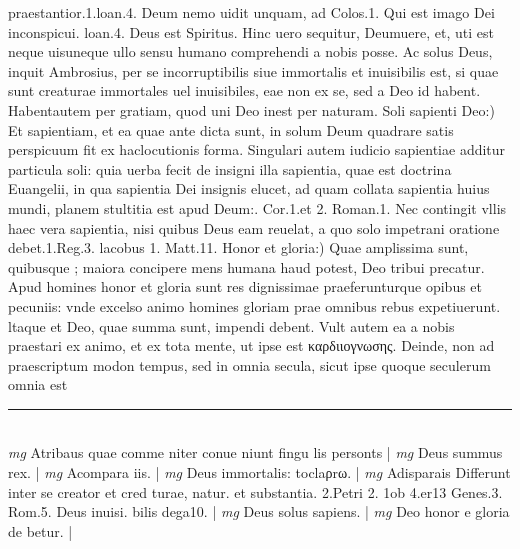 \documentclass{article}
\begin{document}
\begin{pages}
praestantior.1.loan.4. Deum nemo uidit unquam, ad Colos.1. Qui est imago Dei inconspicui. loan.4. Deus est Spiritus. Hinc uero sequitur, Deumuere, et, uti est neque  uisuneque  ullo sensu humano comprehendi a nobis posse. Ac solus Deus, inquit Ambrosius, per se incorruptibilis siue immortalis et inuisibilis est, si quae sunt creaturae immortales uel inuisibiles, eae non ex se, sed a Deo id habent. Habentautem per gratiam, quod uni Deo inest per naturam.  \pend\pstart Soli sapienti Deo:) Et sapientiam, et ea quae ante dicta sunt, in solum Deum quadrare satis perspicuum fit ex haclocutionis forma. Singulari autem iudicio sapientiae additur particula soli: quia uerba fecit de insigni illa sapientia, quae est doctrina Euangelii, in qua sapientia Dei insignis elucet, ad quam collata sapientia huius mundi, planem stultitia est apud Deum:. Cor.1.et 2. Roman.1. Nec contingit vllis haec vera sapientia, nisi quibus  Deus eam reuelat, a quo solo impetrani oratione debet.1.Reg.3. lacobus 1. Matt.11. Honor et gloria:) Quae amplissima sunt, quibusque ; maiora concipere mens humana haud potest, Deo tribui precatur. Apud homines honor et gloria sunt res dignissimae praeferunturque  opibus et pecuniis: vnde excelso animo homines gloriam prae omnibus rebus expetiuerunt. ltaque  et Deo, quae summa sunt, impendi debent. Vult autem ea a nobis praestari ex animo, et ex tota mente, ut ipse est καρδιιογνωσης. Deinde, non ad praescriptum modon tempus, sed in omnia secula, sicut ipse quoque  seculerum omnia est  \pend
\vspace{0.5cm}\noindent
\vspace{0.2cm}\rule{1cm}{0.2pt}\\ 
\hspace{0.2cm}\textit{mg}
\footnotesize Atribaus quae comme niter conue niunt fingu lis personts 
\normalsize| 
\hspace{0.2cm}\textit{mg}
\footnotesize Deus summus rex. 
\normalsize| 
\hspace{0.2cm}\textit{mg}
\footnotesize Acompara iis. 
\normalsize| 
\hspace{0.2cm}\textit{mg}
\footnotesize Deus immortalis: toclaρrω. 
\normalsize| 
\hspace{0.2cm}\textit{mg}
\footnotesize Adisparais Differunt inter se creator et cred turae, natur. et substantia. 2.Petri 2. 1ob 4.er13 Genes.3. Rom.5. Deus inuisi. bilis dega10. 
\normalsize| 
\hspace{0.2cm}\textit{mg}
\footnotesize Deus solus sapiens. 
\normalsize| 
\hspace{0.2cm}\textit{mg}
\footnotesize Deo honor e gloria de betur. 
\normalsize| 

\end{pages}
\end{document}
